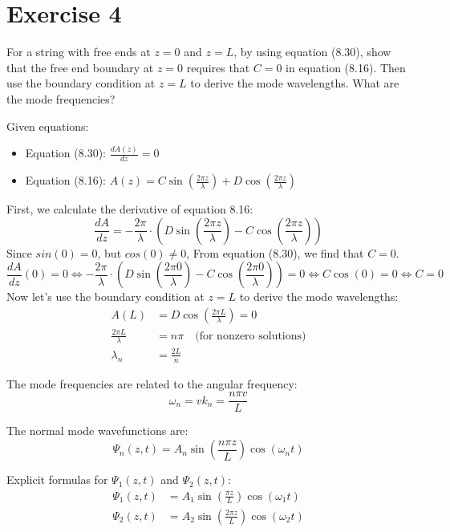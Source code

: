 \documentclass{article}
\newcommand{\pregunta}[1]{\begin{note}#1\end{note}}
\begin{document}
\section*{Exercise 4}
\pregunta{
For a string with free ends at \(z = 0\) and \(z = L\), by using equation (8.30), show that the free end boundary at \(z = 0\) requires that \(C = 0\) in equation (8.16). Then use the boundary condition at \(z = L\) to derive the mode wavelengths. What are the mode frequencies?

Given equations:
\begin{itemize}
    \item Equation (8.30):  $\frac{dA(z)}{dz} = 0$
    \item Equation (8.16):  $A(z) = C\sin\left(\frac{2\pi z}{\lambda}\right) + D\cos\left(\frac{2\pi z}{\lambda}\right)$
\end{itemize}
}
\noindent First, we calculate the derivative of equation 8.16:
\[
\dfrac{dA}{dz}=-\dfrac{2{\pi}}{\lambda}\cdot\left(D\sin\left(\frac{2{\pi}z}{{\lambda}}\right)-C\cos\left(\frac{2{\pi}z}{{\lambda}}\right)\right)
\]
Since $sin(0)=0$, but $cos(0)\neq 0$, From equation (8.30), we find that \(C = 0\).
\[\dfrac{dA}{dz}(0)=0\Longleftrightarrow -\dfrac{2{\pi}}{\lambda}\cdot\left(D\sin\left(\frac{2{\pi}0}{{\lambda}}\right)-C\cos\left(\frac{2{\pi}0}{{\lambda}}\right)\right)=0\Longleftrightarrow C\cos (0) =0 \Longleftrightarrow C=0\]
\noindent Now let's use the boundary condition at \(z = L\) to derive the mode wavelengths:
\begin{align}
    A(L) &= D\cos\left(\frac{2\pi L}{\lambda}\right) = 0 \\
    \frac{2\pi L}{\lambda} &= n\pi \quad \text{(for nonzero solutions)} \\
    \lambda_n &= \frac{2L}{n}
\end{align}

\noindent The mode frequencies are related to the angular frequency:
\[ \omega_n = v k_n = \frac{n\pi v}{L} \]

\noindent The normal mode wavefunctions are:
\[ \Psi_n(z, t) = A_n \sin\left(\frac{n\pi z}{L}\right) \cos(\omega_n t) \]

\noindent Explicit formulas for \(\Psi_1(z, t)\) and \(\Psi_2(z, t)\):
\begin{align}
    \Psi_1(z, t) &= A_1 \sin\left(\frac{\pi z}{L}\right) \cos(\omega_1 t) \\
    \Psi_2(z, t) &= A_2 \sin\left(\frac{2\pi z}{L}\right) \cos(\omega_2 t)
\end{align}
\end{document}
